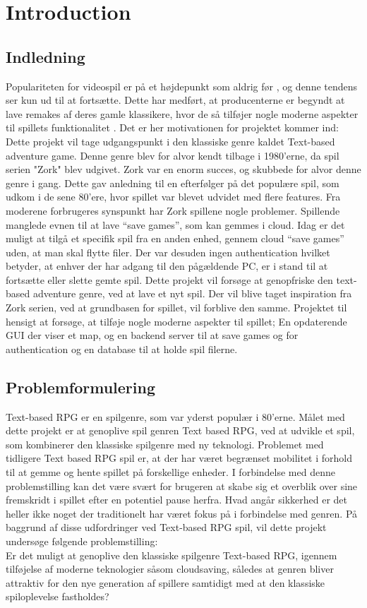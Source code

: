 \section{Introduction}
\subsection{Indledning}

Populariteten for videospil er på et højdepunkt som aldrig før \cite{WE-PC}, og denne tendens ser kun ud til at fortsætte. Dette har medført, at producenterne er begyndt at lave remakes af deres gamle klassikere, hvor de så tilføjer nogle moderne aspekter til spillets funktionalitet \cite{Protocol}. Det er her motivationen for projektet kommer ind: \\

Dette projekt vil tage udgangspunkt i den klassiske genre kaldet Text-based adventure game. Denne genre blev for alvor kendt tilbage i 1980'erne, da spil serien "Zork" blev udgivet. Zork var en enorm succes\cite{WikiZork}, og skubbede for alvor denne genre i gang. 
Dette gav anledning til en efterfølger på det populære spil, som udkom i de sene 80’ere, hvor spillet var blevet udvidet med flere features.
Fra moderene forbrugeres synspunkt har Zork spillene nogle problemer. Spillende manglede evnen til at lave ``save games'', som kan gemmes i cloud. 
Idag er det muligt at tilgå et specifik spil fra en anden enhed, gennem cloud ``save games'' uden, at man skal flytte filer. Der var desuden ingen 
authentication hvilket betyder, at enhver der har adgang til den pågældende PC, er i stand til at fortsætte eller slette gemte spil. 
Dette projekt vil forsøge at genopfriske den text-based adventure genre, ved at lave et nyt spil. Der vil blive taget inspiration 
fra Zork serien, ved at grundbasen for spillet, vil forblive den samme. Projektet til hensigt at forsøge, at tilføje nogle moderne aspekter til spillet;
En opdaterende GUI der viser et map, og en backend server til at save games og for authentication og en database til at holde spil filerne.

\subsection{Problemformulering}
Text-based RPG er en spilgenre, som var yderst populær i 80’erne. Målet med dette projekt er at genoplive spil genren Text based RPG, ved at udvikle et spil, 
som kombinerer den klassiske spilgenre med ny teknologi. Problemet med tidligere Text based RPG spil er, at der har været begrænset mobilitet i forhold 
til at gemme og hente spillet på forskellige enheder. I forbindelse med denne problemstilling kan det være svært for brugeren at skabe sig et overblik over
sine fremskridt i spillet efter en potentiel pause herfra. Hvad angår sikkerhed er det heller ikke noget der traditionelt har været fokus på i forbindelse med genren. 
På baggrund af disse udfordringer ved Text-based RPG spil, vil dette projekt undersøge følgende problemstilling: \\

Er det muligt at genoplive den klassiske spilgenre Text-based RPG, igennem tilføjelse af moderne teknologier såsom cloudsaving, således at genren bliver attraktiv
for den nye generation af spillere samtidigt med at den klassiske spiloplevelse fastholdes?
\newpage
